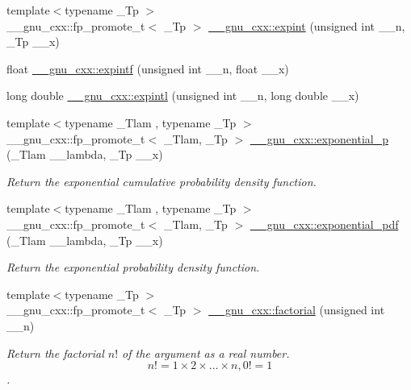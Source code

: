 \begin{DoxyCompactItemize}
\item 
{\footnotesize template$<$typename \+\_\+\+Tp $>$ }\\\+\_\+\+\_\+gnu\+\_\+cxx\+::fp\+\_\+promote\+\_\+t$<$ \+\_\+\+Tp $>$ \hyperlink{group__mathsf__gnu_gadaf9317953b826975da72d1858f01ea5}{\+\_\+\+\_\+gnu\+\_\+cxx\+::expint} (unsigned int \+\_\+\+\_\+n, \+\_\+\+Tp \+\_\+\+\_\+x)
\item 
float \hyperlink{group__mathsf__gnu_ga85751691a29807d99e990fcba61312f3}{\+\_\+\+\_\+gnu\+\_\+cxx\+::expintf} (unsigned int \+\_\+\+\_\+n, float \+\_\+\+\_\+x)
\item 
long double \hyperlink{group__mathsf__gnu_ga720ca0b275784c8b82193f427a2b3553}{\+\_\+\+\_\+gnu\+\_\+cxx\+::expintl} (unsigned int \+\_\+\+\_\+n, long double \+\_\+\+\_\+x)
\item 
{\footnotesize template$<$typename \+\_\+\+Tlam , typename \+\_\+\+Tp $>$ }\\\+\_\+\+\_\+gnu\+\_\+cxx\+::fp\+\_\+promote\+\_\+t$<$ \+\_\+\+Tlam, \+\_\+\+Tp $>$ \hyperlink{group__mathsf__gnu_gaa546f47f8ab943d2c10b56bec8a44079}{\+\_\+\+\_\+gnu\+\_\+cxx\+::exponential\+\_\+p} (\+\_\+\+Tlam \+\_\+\+\_\+lambda, \+\_\+\+Tp \+\_\+\+\_\+x)
\begin{DoxyCompactList}\small\item\em Return the exponential cumulative probability density function. \end{DoxyCompactList}\item 
{\footnotesize template$<$typename \+\_\+\+Tlam , typename \+\_\+\+Tp $>$ }\\\+\_\+\+\_\+gnu\+\_\+cxx\+::fp\+\_\+promote\+\_\+t$<$ \+\_\+\+Tlam, \+\_\+\+Tp $>$ \hyperlink{group__mathsf__gnu_ga7f35499a94fd8930810809988332161e}{\+\_\+\+\_\+gnu\+\_\+cxx\+::exponential\+\_\+pdf} (\+\_\+\+Tlam \+\_\+\+\_\+lambda, \+\_\+\+Tp \+\_\+\+\_\+x)
\begin{DoxyCompactList}\small\item\em Return the exponential probability density function. \end{DoxyCompactList}\item 
{\footnotesize template$<$typename \+\_\+\+Tp $>$ }\\\+\_\+\+\_\+gnu\+\_\+cxx\+::fp\+\_\+promote\+\_\+t$<$ \+\_\+\+Tp $>$ \hyperlink{group__mathsf__gnu_ga963b1612f50b0964f5f42c9f289aab68}{\+\_\+\+\_\+gnu\+\_\+cxx\+::factorial} (unsigned int \+\_\+\+\_\+n)
\begin{DoxyCompactList}\small\item\em Return the factorial $ n! $ of the argument as a real number. \[ n! = 1 \times 2 \times ... \times n, 0! = 1 \]. \end{DoxyCompactList}\item 

\end{DoxyCompactItemize}
